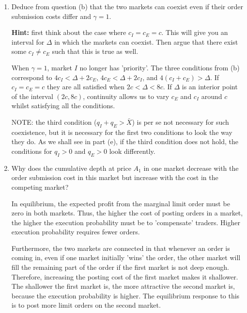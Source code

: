 \documentclass[11pt
, answers
]{exam}
\begin{document}
\begin{enumerate}[label=(\alph*). ]
	
	
	\item Deduce from question (b) that the two markets can coexist even if their order submission costs differ and $\gamma=1$. 
	
	\textbf{Hint:} first think about the case where $c_{I}=c_{E}=c$. This will give you an interval for $\Delta$ in which the markets can coexist. Then argue that there exist some $c_{I} \ne c_{E}$ such that this is true as well.
	
	\begin{solution}
		When $\gamma=1$, market $I$ no longer has 'priority'. The three conditions from (b) correspond to $4c_{I} < \Delta + 2c_{E}$, $4c_{E}<\Delta+2c_{I}$, and $4(c_{I}+c_{E})>\Delta$. If $c_{I}=c_{E}=c$ they are all satisfied when $2c < \Delta < 8c$. If $\Delta$ is an interior point of the interval $(2c, 8c)$, continuity allows us to vary $c_{E}$ and $c_{I}$ around $c$ whilst satisfying all the conditions.
		
		NOTE: the third condition ($q_I+q_E > \bar{X}$) is per se not necessary for such coexistence, but it is necessary for the first two conditions to look the way they do. As we shall see in part (e), if the third condition does not hold, the conditions for $q_I > 0$ and $q_E > 0$ look differently.
	\end{solution}
	
	
	
	\item Why does the cumulative depth at price $A_{1}$ in one market decrease with the order submission cost in this market but increase with the cost in the competing market?
	
	\begin{solution}
		In equilibrium, the expected profit from the marginal limit order must be zero in both markets. Thus, the higher the cost of posting orders in a market, the higher the execution probability must be to 'compensate' traders. Higher execution probability requires fewer orders. 
		
		Furthermore, the two markets are connected in that whenever an order is coming in, even if one market initially 'wins' the order, the other market will fill the remaining part of the order if the first market is not deep enough. Therefore, increasing the posting cost of the first market makes it shallower. The shallower the first market is, the more attractive the second market is, because the execution probability is higher. The equilibrium response to this is to post more limit orders on the second market. 
	\end{solution}
	

\end{enumerate}
\end{document}
